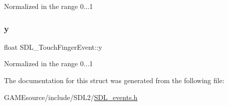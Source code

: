 Normalized in the range 0...1 \mbox{\label{struct_s_d_l___touch_finger_event_ac2bb8af638d2927a8e13f6ffe8f9384e}} 
\subsubsection{\texorpdfstring{y}{y}}
{\footnotesize\ttfamily float S\+D\+L\+\_\+\+Touch\+Finger\+Event\+::y}

Normalized in the range 0...1 

The documentation for this struct was generated from the following file\+:\begin{DoxyCompactItemize}
\item 
G\+A\+M\+Esource/include/\+S\+D\+L2/\mbox{\hyperlink{_s_d_l__events_8h}{S\+D\+L\+\_\+events.\+h}}\end{DoxyCompactItemize}
